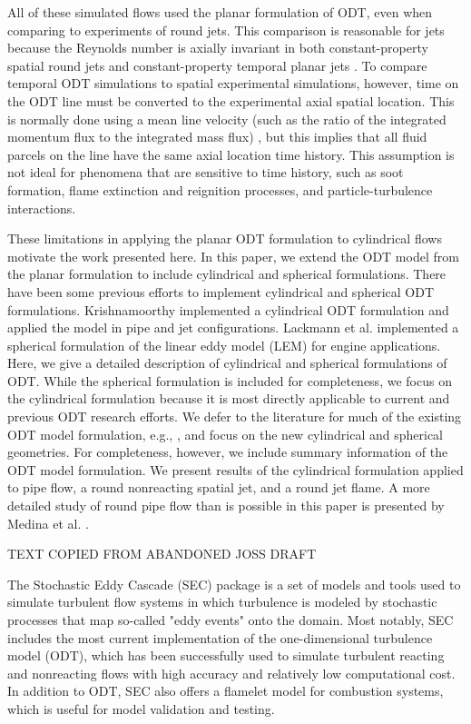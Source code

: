 \documentclass[preprint,12pt, a4paper]{elsarticle}
\begin{document}
All of these simulated flows used the planar formulation of ODT, even when comparing to experiments of round jets. This comparison is reasonable for jets because the Reynolds number is axially invariant in both constant-property spatial round jets and constant-property temporal planar jets \cite{Sun_2017}. To compare temporal ODT simulations to spatial experimental simulations, however, time on the ODT line must be converted to the experimental axial spatial location. This is normally done using a mean line velocity (such as the ratio of the integrated momentum flux to the integrated mass flux) \cite{Sun_2017}, but this implies that all fluid parcels on the line have the same axial location time history. This assumption is not ideal for phenomena that are sensitive to time history, such as soot formation, flame extinction and reignition processes, and particle-turbulence interactions. 

These limitations in applying the planar ODT formulation to cylindrical flows motivate the work presented here. In this paper, we extend the ODT model from the planar formulation to include cylindrical and spherical formulations. There have been some previous efforts to implement cylindrical and spherical ODT formulations. Krishnamoorthy \cite{Niveditha_thesis} implemented a cylindrical ODT formulation and applied the model in pipe and jet configurations. Lackmann et al. \cite{Lackmann_2017} implemented a spherical formulation of the linear eddy model (LEM) for engine applications. Here, we give a detailed description of cylindrical and spherical formulations of ODT. While the spherical formulation is included for completeness, we focus on the cylindrical formulation because it is most directly applicable to current and previous ODT research efforts. We defer to the literature for much of the existing ODT model formulation, e.g., \cite{Lignell_2013,Ashurst_2005,Kerstein_2001}, and focus on the new cylindrical and spherical geometries. For completeness, however, we include summary information of the ODT model formulation. We present results of the cylindrical formulation applied to pipe flow, a round nonreacting spatial jet, and a round jet flame. A more detailed study of round pipe flow than is possible in this paper is presented by Medina et al. \cite{Medina_2017}.

TEXT COPIED FROM ABANDONED JOSS DRAFT

The Stochastic Eddy Cascade (SEC) package is a set of models and tools used to simulate turbulent flow systems in which turbulence is modeled by stochastic processes that map so-called "eddy events" onto the domain. Most notably, SEC includes the most current implementation of the one-dimensional turbulence model (ODT), which has been successfully used to simulate turbulent reacting and nonreacting flows with high accuracy and relatively low computational cost. In addition to ODT, SEC also offers a flamelet model for combustion systems, which is useful for model validation and testing. 
\end{document}
